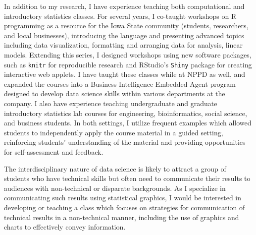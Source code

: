 \documentclass[12pt, letterpaper, sans]{moderncv}
\begin{document}
In addition to my research, I have experience teaching both computational and introductory statistics classes. For several years, I co-taught workshops on R programming as a resource for the Iowa State community (students, researchers, and local businesses), introducing the language and presenting advanced topics including data visualization, formatting and arranging data for analysis, linear models. Extending this series, I designed workshops using new software packages, such as \texttt{knitr} for reproducible research and RStudio's \texttt{Shiny} package for creating interactive web applets. I have taught these classes while at NPPD as well, and expanded the courses into a Business Intelligence Embedded Agent program designed to develop data science skills within various departments at the company. I also have experience teaching undergraduate and graduate introductory statistics lab courses for engineering, bioinformatics, social science, and business students. In both settings, I utilize frequent examples which allowed students to independently apply the course material in a guided setting, reinforcing students' understanding of the material and providing opportunities for self-assessment and feedback. 

The interdisciplinary nature of data science is likely to attract a group of students who have technical skills but often need to communicate their results to audiences with non-technical or disparate backgrounds. As I specialize in communicating such results using statistical graphics, I would be interested in developing or teaching a class which focuses on strategies for communication of technical results in a non-technical manner, including the use of graphics and charts to effectively convey information. 

\end{document}
